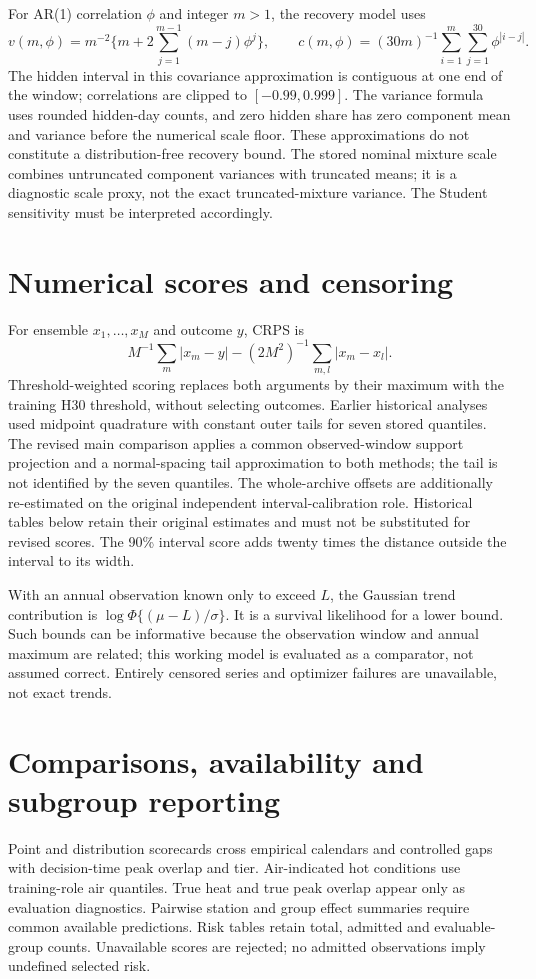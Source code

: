 \documentclass[draft]{agujournal2025}
\begin{document}
For AR(1) correlation $\phi$ and integer $m>1$, the recovery model uses
\[
v(m,\phi)=m^{-2}\{m+2\sum_{j=1}^{m-1}(m-j)\phi^j\},\qquad
c(m,\phi)=(30m)^{-1}\sum_{i=1}^{m}\sum_{j=1}^{30}\phi^{|i-j|}.
\]
The hidden interval in this covariance approximation is contiguous at one end of the window; correlations are clipped to $[-0.99,0.999]$. The variance formula uses rounded hidden-day counts, and zero hidden share has zero component mean and variance before the numerical scale floor. These approximations do not constitute a distribution-free recovery bound. The stored nominal mixture scale combines untruncated component variances with truncated means; it is a diagnostic scale proxy, not the exact truncated-mixture variance. The Student sensitivity must be interpreted accordingly.

\section{Numerical scores and censoring}
For ensemble $x_1,\ldots,x_M$ and outcome $y$, CRPS is
\[ M^{-1}\sum_m|x_m-y|-(2M^2)^{-1}\sum_{m,l}|x_m-x_l|. \]
Threshold-weighted scoring replaces both arguments by their maximum with the training H30 threshold, without selecting outcomes. Earlier historical analyses used midpoint quadrature with constant outer tails for seven stored quantiles. The revised main comparison applies a common observed-window support projection and a normal-spacing tail approximation to both methods; the tail is not identified by the seven quantiles. The whole-archive offsets are additionally re-estimated on the original independent interval-calibration role. Historical tables below retain their original estimates and must not be substituted for revised scores. The 90\% interval score adds twenty times the distance outside the interval to its width.

With an annual observation known only to exceed $L$, the Gaussian trend contribution is $\log\Phi\{(\mu-L)/\sigma\}$. It is a survival likelihood for a lower bound. Such bounds can be informative because the observation window and annual maximum are related; this working model is evaluated as a comparator, not assumed correct. Entirely censored series and optimizer failures are unavailable, not exact trends.

\section{Comparisons, availability and subgroup reporting}
Point and distribution scorecards cross empirical calendars and controlled gaps with decision-time peak overlap and tier. Air-indicated hot conditions use training-role air quantiles. True heat and true peak overlap appear only as evaluation diagnostics. Pairwise station and group effect summaries require common available predictions. Risk tables retain total, admitted and evaluable-group counts. Unavailable scores are rejected; no admitted observations imply undefined selected risk.
\end{document}
